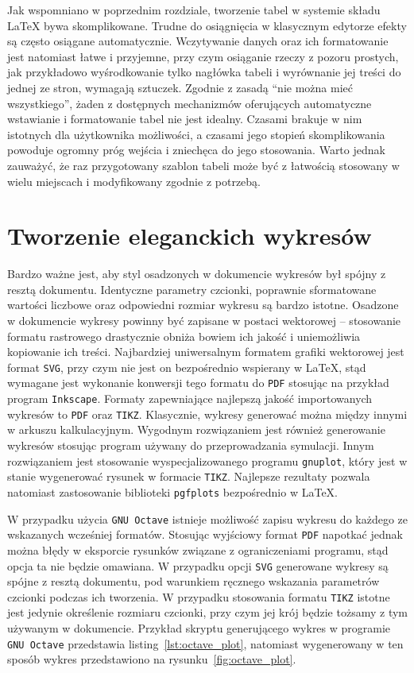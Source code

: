Jak wspomniano w poprzednim rozdziale, tworzenie tabel w systemie składu \LaTeX{} bywa skomplikowane. Trudne do osiągnięcia w klasycznym edytorze efekty są często osiągane automatycznie. Wczytywanie danych oraz ich formatowanie jest natomiast łatwe i przyjemne, przy czym osiąganie rzeczy z pozoru prostych, jak przykładowo wyśrodkowanie tylko nagłówka tabeli i wyrównanie jej treści do jednej ze stron, wymagają sztuczek. Zgodnie z zasadą \enquote{nie można mieć wszystkiego}, żaden z dostępnych mechanizmów oferujących automatyczne wstawianie i formatowanie tabel nie jest idealny. Czasami brakuje w nim istotnych dla użytkownika możliwości, a czasami jego stopień skomplikowania powoduje ogromny próg wejścia i zniechęca do jego stosowania. Warto jednak zauważyć, że raz przygotowany szablon tabeli może być z łatwością stosowany w wielu miejscach i modyfikowany zgodnie z potrzebą.

\section{Tworzenie eleganckich wykresów}

Bardzo ważne jest, aby styl osadzonych w dokumencie wykresów był spójny z resztą dokumentu. Identyczne parametry czcionki, poprawnie sformatowane wartości liczbowe oraz odpowiedni rozmiar wykresu są bardzo istotne. Osadzone w dokumencie wykresy powinny być zapisane w postaci wektorowej -- stosowanie formatu rastrowego drastycznie obniża bowiem ich jakość i uniemożliwia kopiowanie ich treści. Najbardziej uniwersalnym formatem grafiki wektorowej jest format \texttt{SVG}, przy czym nie jest on bezpośrednio wspierany w \LaTeX{}, stąd wymagane jest wykonanie konwersji tego formatu do \texttt{PDF} stosując na przykład program \texttt{Inkscape}. Formaty zapewniające najlepszą jakość importowanych wykresów to \texttt{PDF} oraz \texttt{TIKZ}. Klasycznie, wykresy generować można między innymi w arkuszu kalkulacyjnym. Wygodnym rozwiązaniem jest również generowanie wykresów stosując program używany do przeprowadzania symulacji. Innym rozwiązaniem jest stosowanie wyspecjalizowanego programu \texttt{gnuplot}, który jest w stanie wygenerować rysunek w formacie \texttt{TIKZ}. Najlepsze rezultaty pozwala natomiast zastosowanie biblioteki \texttt{pgfplots} bezpośrednio w \LaTeX{}.

W przypadku użycia \texttt{GNU Octave} istnieje możliwość zapisu wykresu do każdego ze wskazanych wcześniej formatów. Stosując wyjściowy format \texttt{PDF} napotkać jednak można błędy w eksporcie rysunków związane z ograniczeniami programu, stąd opcja ta nie będzie omawiana. W przypadku opcji \texttt{SVG} generowane wykresy są spójne z resztą dokumentu, pod warunkiem ręcznego wskazania parametrów czcionki podczas ich tworzenia. W przypadku stosowania formatu \texttt{TIKZ} istotne jest jedynie określenie rozmiaru czcionki, przy czym jej krój będzie tożsamy z tym używanym w dokumencie. Przykład skryptu generującego wykres w programie \texttt{GNU Octave} przedstawia listing~\ref{lst:octave_plot}, natomiast wygenerowany w ten sposób wykres przedstawiono na rysunku~\ref{fig:octave_plot}.


